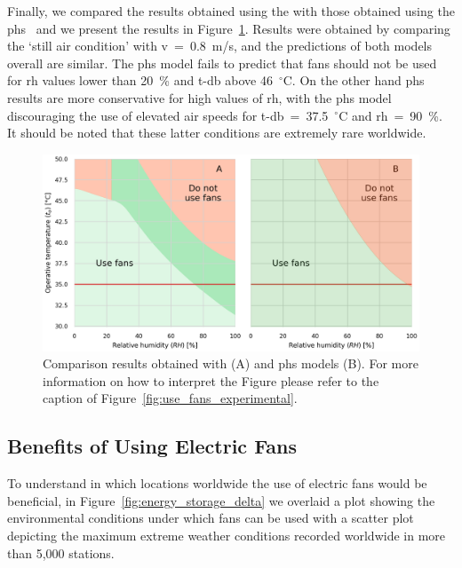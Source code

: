 Finally, we compared the results obtained using the  with those obtained using the \ac{phs}~\cite{iso7933} and we present the results in Figure~\ref{fig:gagge_phs}.
Results were obtained by comparing the `still air condition' with \ac{v}~=~0.8~m/s, and the predictions of both models overall are similar.
The \ac{phs} model fails to predict that fans should not be used for \ac{rh} values lower than 20~\% and \ac{t-db} above 46~$^{\circ}$C\@.
On the other hand \ac{phs} results are more conservative for high values of \ac{rh}, with the \ac{phs} model discouraging the use of elevated air speeds for \ac{t-db}~=~37.5~$^{\circ}$C and \ac{rh}~=~90~\%\@.
It should be noted that these latter conditions are extremely rare worldwide.

\begin{figure}[hbt!]
    \centering
    \includegraphics[width=\textwidth]{figures/phs_gagge}
    \caption{Comparison results obtained with  (A) and \ac{phs} models (B).
    For more information on how to interpret the Figure please refer to the caption of Figure~\ref{fig:use_fans_experimental}.}
    \label{fig:gagge_phs}
\end{figure}

\subsection{Benefits of Using Electric Fans}\label{subsec:use-fans}

To understand in which locations worldwide the use of electric fans would be beneficial, in Figure~\ref{fig:energy_storage_delta} we overlaid a plot showing the environmental conditions under which fans can be used with a scatter plot depicting the maximum extreme weather conditions recorded worldwide in more than 5,000 stations.

